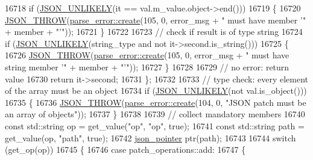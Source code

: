 \begin{DoxyCode}
16718                 \textcolor{keywordflow}{if} (\hyperlink{json_8hpp_ab77582407c64944e7db1ea95ab520253}{JSON\_UNLIKELY}(it == val.m\_value.object->end()))
16719                 \{
16720                     \hyperlink{json_8hpp_a6c274f6db2e65c1b66c7d41b06ad690f}{JSON\_THROW}(\hyperlink{classnlohmann_1_1detail_1_1parse__error_a9fd60ad6bce80fd99686ad332faefd37}{parse\_error::create}(105, 0, error\_msg + \textcolor{stringliteral}{" must
       have member '"} + member + \textcolor{stringliteral}{"'"}));
16721                 \}
16722 
16723                 \textcolor{comment}{// check if result is of type string}
16724                 \textcolor{keywordflow}{if} (\hyperlink{json_8hpp_ab77582407c64944e7db1ea95ab520253}{JSON\_UNLIKELY}(string\_type and not it->second.is\_string()))
16725                 \{
16726                     \hyperlink{json_8hpp_a6c274f6db2e65c1b66c7d41b06ad690f}{JSON\_THROW}(\hyperlink{classnlohmann_1_1detail_1_1parse__error_a9fd60ad6bce80fd99686ad332faefd37}{parse\_error::create}(105, 0, error\_msg + \textcolor{stringliteral}{" must
       have string member '"} + member + \textcolor{stringliteral}{"'"}));
16727                 \}
16728 
16729                 \textcolor{comment}{// no error: return value}
16730                 \textcolor{keywordflow}{return} it->second;
16731             \};
16732 
16733             \textcolor{comment}{// type check: every element of the array must be an object}
16734             \textcolor{keywordflow}{if} (\hyperlink{json_8hpp_ab77582407c64944e7db1ea95ab520253}{JSON\_UNLIKELY}(not val.is\_object()))
16735             \{
16736                 \hyperlink{json_8hpp_a6c274f6db2e65c1b66c7d41b06ad690f}{JSON\_THROW}(\hyperlink{classnlohmann_1_1detail_1_1parse__error_a9fd60ad6bce80fd99686ad332faefd37}{parse\_error::create}(104, 0, \textcolor{stringliteral}{"JSON patch must be an
       array of objects"}));
16737             \}
16738 
16739             \textcolor{comment}{// collect mandatory members}
16740             \textcolor{keyword}{const} std::string op = get\_value(\textcolor{stringliteral}{"op"}, \textcolor{stringliteral}{"op"}, \textcolor{keyword}{true});
16741             \textcolor{keyword}{const} std::string path = get\_value(op, \textcolor{stringliteral}{"path"}, \textcolor{keyword}{true});
16742             \hyperlink{classnlohmann_1_1basic__json_a6886a5001f5b449ad316101a311ce536}{json\_pointer} ptr(path);
16743 
16744             \textcolor{keywordflow}{switch} (get\_op(op))
16745             \{
16746                 \textcolor{keywordflow}{case} patch\_operations::add:
16747                 \{

\end{DoxyCode}

